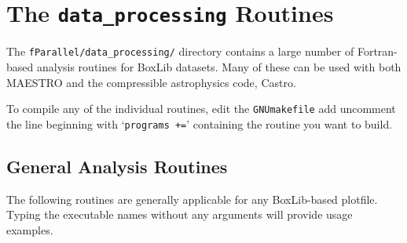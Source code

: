 \section{The {\tt data\_processing} Routines}
\label{sec:analysis}

The {\tt fParallel/data\_processing/} directory contains a large
number of Fortran-based analysis routines for BoxLib datasets.  Many
of these can be used with both MAESTRO and the compressible
astrophysics code, Castro.

To compile any of the individual routines, edit the {\tt GNUmakefile}
add uncomment the line beginning with `{\tt programs +=}' containing
the routine you want to build.

\subsection{General Analysis Routines}

The following routines are generally applicable for any BoxLib-based
plotfile.  Typing the executable names without any arguments will
provide usage examples.

